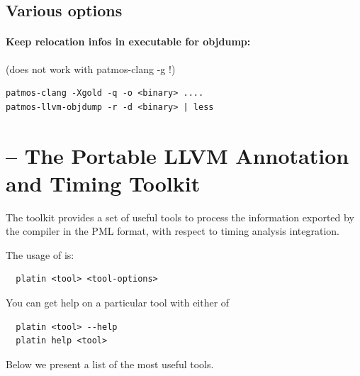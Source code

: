 \subsection{Various options}

\paragraph{Keep relocation infos in executable for objdump:} (does not work with patmos-clang -g !)

\begin{verbatim}
patmos-clang -Xgold -q -o <binary> ....
patmos-llvm-objdump -r -d <binary> | less
\end{verbatim}




\section{ -- The Portable LLVM Annotation and Timing Toolkit}
\label{sec:toolchain:platin}

The  toolkit provides a set of useful tools to process the
information exported by the compiler in the PML format, with respect to
timing analysis integration.


The usage of  is:

\begin{verbatim}
  platin <tool> <tool-options>
\end{verbatim}

You can get help on a particular tool with either of

\begin{verbatim}
  platin <tool> --help
  platin help <tool>
\end{verbatim}


Below we present a list of the most useful tools.

